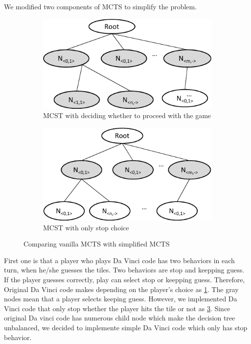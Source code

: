 We modified two components of MCTS to simplify the problem.
\begin{figure}
\begin{subfigure}[b]{0.95\columnwidth}
\includegraphics [width=0.95\columnwidth]{figures/sub_guess_1.pdf}
\caption{MCST with deciding whether to proceed with the game }
\label{fig:proceed_game}
\end{subfigure}
\par\bigskip
\begin{subfigure}[b]{0.95\columnwidth}
\includegraphics [width=0.95\columnwidth]{figures/sub_guess_2.pdf}
\caption{MCST with only stop choice}
\label{fig:stop_game}
\end{subfigure}
\caption{Comparing vanilla MCTS with simplified MCTS}
\end{figure}

First one is that a player who plays Da Vinci code has two behaviors in each turn, when he/she guesses the tiles. 
Two behaviors are stop and keepping guess.
If the player guesses correctly, play can select stop or keepping guess. 
Therefore, Original Da Vinci code makes depending on the player's choice as \cref{fig:proceed_game}.
The gray nodes mean that a player selects keeping guess. 
However, we implemented Da Vinci code that only stop whether the player hits the tile or not as \cref{fig:stop_game}. 
Since original Da vinci code has numerous child node which make the decision tree unbalanced, we decided to implemente simple Da Vinci code which only has stop behavior.
 
